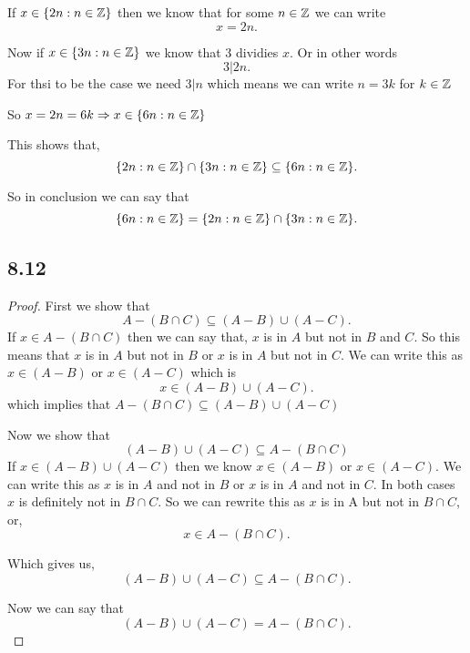 \documentclass[a4paper]{report}
\begin{document}
If $x \in \{2n : n \in \mathbb{Z} \}$ then we know that for some $n \in  \mathbb{Z}$ we can write \[
x = 2n
.\] 

Now if $x \in \{3n : n \in \mathbb{Z} \}$  we know that $3$ dividies  $x$. Or in other words \[
3 | 2n
.\] 
For thsi to be the case we need $3 | n$ which means we can write $n = 3k$ for  $k \in \mathbb{Z}$

So  $x = 2n = 6k \Rightarrow x \in \{6n : n \in \mathbb{Z}\}$ 

This shows that, \[
\{2n : n \in \mathbb{Z} \} \cap \{3n : n \in \mathbb{Z}\}\subseteq  \{6n:n \in \mathbb{Z}\} 
.\] 

So in conclusion we can say that  \[
  \{6n:n \in \mathbb{Z}\} = \{2n : n \in \mathbb{Z} \} \cap \{3n : n \in \mathbb{Z}\} 
.\] 
            

\subsection*{8.12}
\begin{proof}
    First we show that \[
    A - (B \cap C) \subseteq (A - B) \cup (A - C)
    .\] 
    If $x \in A - (B \cap C)$ then we can say that, $x$ is in $A$ but not in $B$ and $C$.  So this means that $x$ is in  $A$ but not in  $B$ or  $x$ is in $A$ but not in  $C$. We can write this as  $x \in (A - B)$ or  $x \in (A - C)$ which is  \[
    x \in (A -B) \cup (A-C)
    .\] 
    which implies that  $A - (B \cap C) \subseteq (A - B) \cup (A - C)$

    Now we show that 
    $$(A - B) \cup (A - C) \subseteq A - (B \cap C)   $$
    If $x \in (A - B) \cup (A - C)$ then we know  $x \in (A - B)$ or  $x \in (A - C)$. We can write this as  $x$ is in $A$ and not in $B$ or  $x$ is in $A$ and not in $C$. In both cases $x$ is definitely not in $B \cap C$. So we can rewrite this as  $x$ is in A but not in $B \cap C$, or,  \[
    x \in A - (B \cap C)
    .\] 

    Which gives us, \[
    (A - B) \cup (A - C) \subseteq A - (B \cap C)   
    .\] 

    Now we can say that \[
    (A - B) \cup (A - C) = A - (B \cap C)   
    .\] 
\end{proof}
\end{document}
